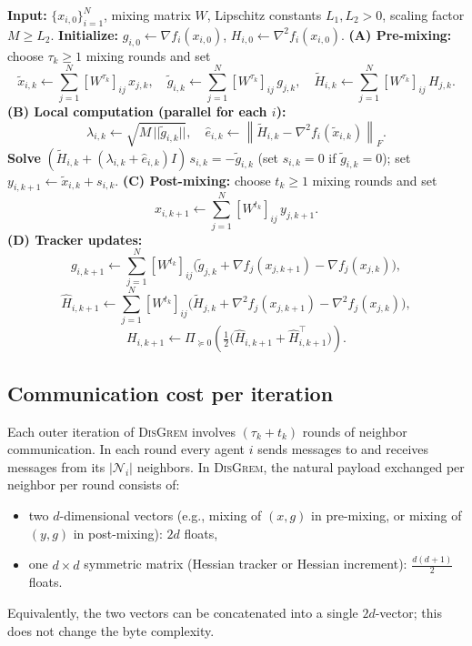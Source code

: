 \documentclass[11pt,a4paper]{article}
\def\norm#1{||#1||}%
\newcommand{\norm}[1]{\left\|#1\right\|}
\newcommand{\normF}[1]{\left\|#1\right\|_F}
\newcommand{\ProjPSD}{\Pi_{\succeq 0}}
\begin{document}
	\begin{algorithm}[H]
		\caption{Decentralized Gradient--Regularized Newton (\textsc{DisGrem})}
		\label{alg:disgrem}
		\begin{algorithmic}[1]
			\State \textbf{Input:} $\{x_{i,0}\}_{i=1}^N$, mixing matrix $W$, Lipschitz constants $L_1,L_2>0$, scaling factor $M\ge L_2$.
			\State \textbf{Initialize:} $g_{i,0}\gets \nabla f_i(x_{i,0})$, $H_{i,0}\gets \nabla^2 f_i(x_{i,0})$.
			\State \textbf{(A) Pre-mixing:} choose $\tau_k\ge 1$ mixing rounds and set
			\[
			\tilde x_{i,k}\gets \sum_{j=1}^N [W^{\tau_k}]_{ij}\,x_{j,k},\quad
			\tilde g_{i,k}\gets \sum_{j=1}^N [W^{\tau_k}]_{ij}\,g_{j,k},\quad
			\tilde H_{i,k}\gets \sum_{j=1}^N [W^{\tau_k}]_{ij}\,H_{j,k}.
			\]
			\State \textbf{(B) Local computation (parallel for each $i$):}
			\[
			\lambda_{i,k} \gets \sqrt{M\,\norm{\tilde g_{i,k}}},\quad
			\hat e_{i,k} \gets \normF{\tilde H_{i,k}-\nabla^2 f_i(\tilde x_{i,k})}.
			\]
			\Statex\hspace{1.6em}\textbf{Solve} $(\tilde H_{i,k}+(\lambda_{i,k}+\hat e_{i,k})I)\,s_{i,k}=-\tilde g_{i,k}$
			\Statex\hspace{1.6em}(set $s_{i,k}=0$ if $\tilde g_{i,k}=0$); set $y_{i,k+1}\gets \tilde x_{i,k}+s_{i,k}$.
			\State \textbf{(C) Post-mixing:} choose $t_k\ge 1$ mixing rounds and set
			\[
			x_{i,k+1}\gets \sum_{j=1}^N [W^{t_k}]_{ij}\,y_{j,k+1}.
			\]
	\State \textbf{(D) Tracker updates:}
	\[
	g_{i,k+1}\gets \sum_{j=1}^N [W^{t_k}]_{ij}\!\Big(\tilde g_{j,k}+\nabla f_j(x_{j,k+1})-\nabla f_j(x_{j,k})\Big),
	\]
	\[
	\widehat H_{i,k+1}\gets \sum_{j=1}^N [W^{t_k}]_{ij}\!\Big(\tilde H_{j,k}+\nabla^2 f_j(x_{j,k+1})-\nabla^2 f_j(x_{j,k})\Big),
	\]
	\[
	H_{i,k+1}\gets \ProjPSD\!\left(\tfrac12\bigl(\widehat H_{i,k+1}+\widehat H_{i,k+1}^\top\bigr)\right).
	\]
			\EndFor
		\end{algorithmic}
	\end{algorithm}
	
\subsection{Communication cost per iteration}\label{ssec:comm}

Each outer iteration of \textsc{DisGrem} involves $(\tau_k + t_k)$ rounds of neighbor communication.
In each round every agent $i$ sends messages to and receives messages from its $|\mathcal N_i|$ neighbors.
In \textsc{DisGrem}, the natural payload exchanged per neighbor per round consists of:
\begin{itemize}[leftmargin=1.2em,itemsep=1pt]
	\item two $d$-dimensional vectors (e.g., mixing of $(x,g)$ in pre-mixing, or mixing of $(y,g)$ in post-mixing): $2d$ floats,
	\item one $d\times d$ symmetric matrix (Hessian tracker or Hessian increment): $\tfrac{d(d+1)}{2}$ floats.
\end{itemize}
Equivalently, the two vectors can be concatenated into a single $2d$-vector; this does not change the byte complexity.
\end{document}

